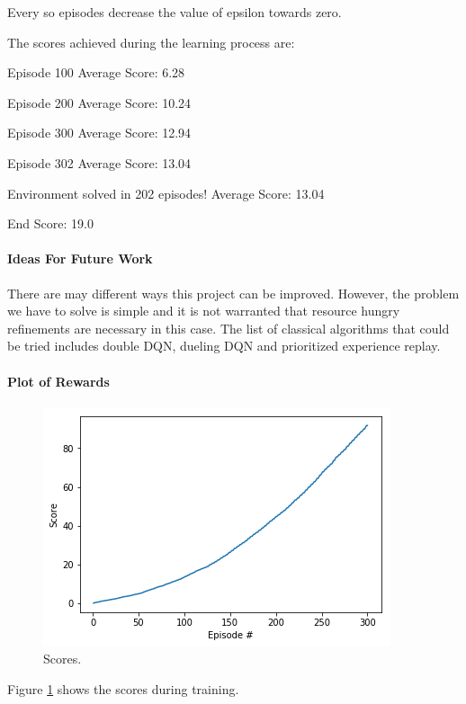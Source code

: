 \documentclass[11pt]{amsart}
\begin{document}
Every so episodes decrease the value of epsilon towards zero.

The scores achieved during the learning process are:

Episode 100	Average Score: 6.28

Episode 200	Average Score: 10.24

Episode 300	Average Score: 12.94

Episode 302	Average Score: 13.04

Environment solved in 202 episodes!	    Average Score: 13.04

End Score: 19.0




\paragraph{\textbf{ Ideas For Future Work}}
    There are may different ways this project can be improved. However, the problem we have to solve is simple and it is not warranted that
    resource hungry refinements are necessary in this case.
     The list of classical algorithms that could be tried includes double DQN, dueling DQN and prioritized experience replay.


\paragraph{\textbf{Plot of Rewards}}
\begin{figure}[h!]
  \includegraphics[width=\linewidth]{scores.png}
  \caption{Scores.}
  \label{fig:scores}
\end{figure}

Figure \ref{fig:scores} shows the scores during training.
\end{document}
